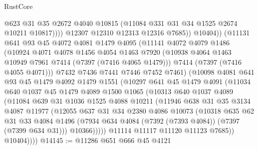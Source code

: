 \begin{lexlean}{RustCore}
\begin{coremodule}
                      @623
                      @31
                      @35
                      @2672
                      @4040
                      @10815
                      (@11084 @331 @31 @34 @1525 @2674 @10211 @10817))))
                @12307
                @12310
                @12313
                @12316
                @7685))
            @10404))
        (@11131
          @641
          @93
          @45
          @4072
          @4081
          @1479
          @4095
          (@11141
            @4072
            @4079
            @1486
            (@10924
              @4071
              @4078
              @1456
              @4054
              @1463
              @7920
              (@10938 @4064 @1463 @10949 @7961 @7414 (@7397 (@7416 @4065 @1479)))
              @7414
              (@7397 (@7416 @4055 @4071)))
            @7432
            @7436
            @7441
            @7446
            @7452
            @7461)
          (@10098
            @4081
            @641
            @93
            @45
            @1479
            @4092
            @1479
            @1551
            (@10297
              @641
              @45
              @1479
              @4091
              (@11034
                @640
                @1037
                @45
                @1479
                @4089
                @1500
                @1065
                (@10313
                  @640
                  @1037
                  @4089
                  (@11084
                    @639
                    @31
                    @1036
                    @1525
                    @4088
                    @10211
                    (@11946
                      @638
                      @31
                      @35
                      @3134
                      @4087
                      @11977
                      (@12055
                        @637
                        @31
                        @34
                        @2380
                        @4086
                        @10073
                        (@10318
                          @635
                          @62
                          @31
                          @33
                          @4084
                          @1496
                          (@7934 @634 @4084 (@7392 (@7393 @4084)) (@7397 (@7399 @634 @31)))
                          @10366)))))
                @11114
                @11117
                @11120
                @11123
                @7685))
            @10404))))
@14145 := @11286
    @651
    @666
    @45
    @4121

\end{coremodule}
\end{lexlean}
